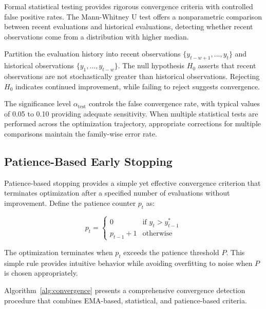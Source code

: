 Formal statistical testing provides rigorous convergence criteria with controlled false positive rates. The Mann-Whitney U test offers a nonparametric comparison between recent evaluations and historical evaluations, detecting whether recent observations come from a distribution with higher median.

Partition the evaluation history into recent observations $\{y_{t-w+1}, \ldots, y_t\}$ and historical observations $\{y_1, \ldots, y_{t-w}\}$. The null hypothesis $H_0$ asserts that recent observations are not stochastically greater than historical observations. Rejecting $H_0$ indicates continued improvement, while failing to reject suggests convergence.

The significance level $\alpha_{\text{test}}$ controls the false convergence rate, with typical values of 0.05 to 0.10 providing adequate sensitivity. When multiple statistical tests are performed across the optimization trajectory, appropriate corrections for multiple comparisons maintain the family-wise error rate.

\subsection{Patience-Based Early Stopping}

Patience-based stopping provides a simple yet effective convergence criterion that terminates optimization after a specified number of evaluations without improvement. Define the patience counter $p_t$ as:

\begin{equation}
p_t = \begin{cases}
0 & \text{if } y_t > y_{t-1}^* \\
p_{t-1} + 1 & \text{otherwise}
\end{cases}
\label{eq:patience_counter}
\end{equation}

The optimization terminates when $p_t$ exceeds the patience threshold $P$. This simple rule provides intuitive behavior while avoiding overfitting to noise when $P$ is chosen appropriately.

Algorithm~\ref{alg:convergence} presents a comprehensive convergence detection procedure that combines EMA-based, statistical, and patience-based criteria.

